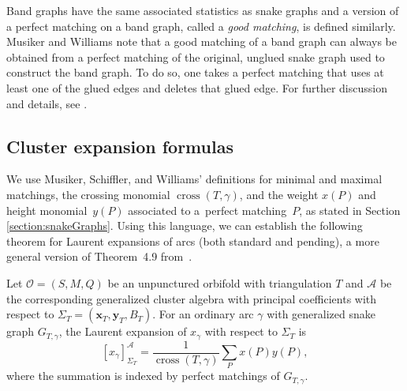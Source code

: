 Band graphs have the same associated statistics as snake graphs and a version of a perfect matching on a band graph, called a \emph{good matching}, is defined similarly. Musiker and Williams note that a good matching of a band graph can always be obtained from a perfect matching of the original, unglued snake graph used to construct the band graph. To do so, one takes a perfect matching that uses at least one of the glued edges and deletes that glued edge. For further discussion and details, see \cite[Section~3]{MW}.

\subsection{Cluster expansion formulas}

We use Musiker, Schiffler, and Williams' definitions for minimal and maximal matchings, the crossing monomial $\operatorname{cross}(T,\gamma)$, and the weight $x(P)$ and height monomial~$y(P)$ associated to a~perfect matching~$P$, as stated in Section \ref{section:snakeGraphs}. Using this language, we can establish the following theorem for Laurent expansions of arcs (both standard and pending), a more general version of Theorem~4.9 from~\cite{MSW}.

\begin{Theorem}\label{Thm:GenSnake+}
Let $\mathcal{O} = (S,M,Q)$ be an unpunctured orbifold with triangulation $T$ and $\mathcal{A}$ be the corresponding generalized cluster algebra with principal coefficients with respect to $\Sigma_T = (\mathbf{x}_T,\mathbf{y}_T,B_T)$. For an ordinary arc $\gamma$ with generalized snake graph $G_{T,\gamma}$, the Laurent expansion of $x_\gamma$ with respect to $\Sigma_T$ is
\[ [x_\gamma]^{\mathcal{A}}_{\Sigma_T} = \frac{1}{\operatorname{cross}(T,\gamma)} \sum_P x(P)y(P), \]
where the summation is indexed by perfect matchings of $G_{T,\gamma}$.
\end{Theorem}
